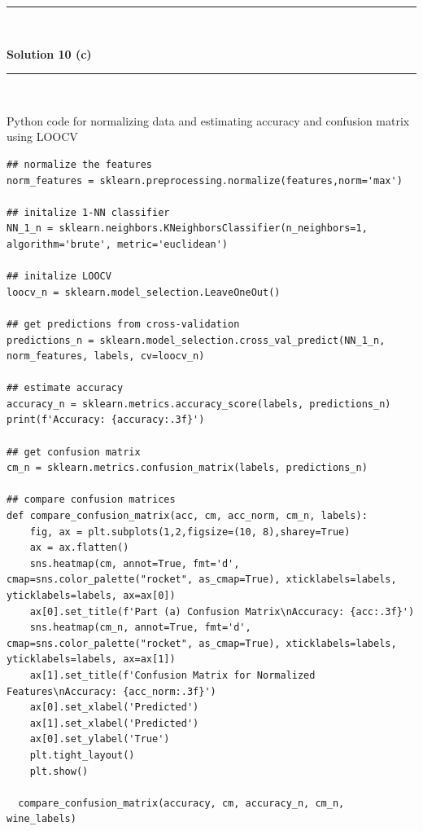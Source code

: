 \documentclass{article}
\begin{document}
\noindent\rule{\textwidth}{0.4pt}\\

\newpage

\textbf{Solution 10 (c)}

\noindent\rule{\textwidth}{0.4pt}\\

\parbox{\textwidth}{Python code for normalizing data and estimating accuracy and confusion matrix using LOOCV}

\begin{center}

\begin{lstlisting}
## normalize the features
norm_features = sklearn.preprocessing.normalize(features,norm='max')
  
## initalize 1-NN classifier
NN_1_n = sklearn.neighbors.KNeighborsClassifier(n_neighbors=1, algorithm='brute', metric='euclidean')
  
## initalize LOOCV
loocv_n = sklearn.model_selection.LeaveOneOut()
  
## get predictions from cross-validation
predictions_n = sklearn.model_selection.cross_val_predict(NN_1_n, norm_features, labels, cv=loocv_n)
  
## estimate accuracy
accuracy_n = sklearn.metrics.accuracy_score(labels, predictions_n)
print(f'Accuracy: {accuracy:.3f}')
  
## get confusion matrix
cm_n = sklearn.metrics.confusion_matrix(labels, predictions_n)
  
## compare confusion matrices
def compare_confusion_matrix(acc, cm, acc_norm, cm_n, labels):
    fig, ax = plt.subplots(1,2,figsize=(10, 8),sharey=True)
    ax = ax.flatten()
    sns.heatmap(cm, annot=True, fmt='d', cmap=sns.color_palette("rocket", as_cmap=True), xticklabels=labels, yticklabels=labels, ax=ax[0])
    ax[0].set_title(f'Part (a) Confusion Matrix\nAccuracy: {acc:.3f}')
    sns.heatmap(cm_n, annot=True, fmt='d', cmap=sns.color_palette("rocket", as_cmap=True), xticklabels=labels, yticklabels=labels, ax=ax[1])
    ax[1].set_title(f'Confusion Matrix for Normalized Features\nAccuracy: {acc_norm:.3f}')
    ax[0].set_xlabel('Predicted')
    ax[1].set_xlabel('Predicted')
    ax[0].set_ylabel('True')
    plt.tight_layout()
    plt.show()
  
  compare_confusion_matrix(accuracy, cm, accuracy_n, cm_n, wine_labels)
\end{lstlisting}

\end{center}
\end{document}
